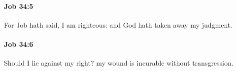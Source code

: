 		\paragraph{Job 34:5} %
			\label{JOB-34-5}

			For Job hath said, I am righteous: and God hath taken away my judgment.


		\paragraph{Job 34:6} %
			\label{JOB-34-6}

			Should I lie against my right? my wound is incurable without transgression.


